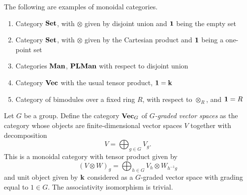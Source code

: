 \begin{example}
The following are examples of monoidal categories.
  \begin{enumerate}
    \item Category $\mathbf{Set}$, with $\otimes$ given by disjoint union and
      $\mathbf{1}$ being the empty set
    \item Category $\mathbf{Set}$, with $\otimes$ given by the Cartesian product
      and $\mathbf{1}$ being a one-point set
    \item Categories $\mathbf{Man}$, $\mathbf{PLMan}$ with respect to disjoint union
    \item Category $\mathbf{Vec}$ with the usual tensor product, $\mathbf{1} = \mathbf{k}$
    \item Category of bimodules over a fixed ring $R$, with respect
      to $\otimes_R$, and $\mathbf{1} = R$

  \end{enumerate}
\end{example}


\begin{example}\label{x:vecg}
  Let $G$ be a group. Define the category $\mathbf{Vec}_G$ of \emph{$G$-graded vector
  spaces} as the category
  whose objects are finite-dimensional vector spaces $V$ together with
  decomposition
  $$
    V=\bigoplus_{g\in G} V_g.
  $$
  This is a monoidal category with tensor product given by
  $$
    (V\otimes W)_g = \bigoplus_{h\in G} V_h \otimes W_{h^{-1}g}
  $$
  and unit object given by $\mathbf{k}$ considered as a $G$-graded vector space with
  grading equal to $1\in G$. The associativity isomorphism is trivial.
\end{example}



